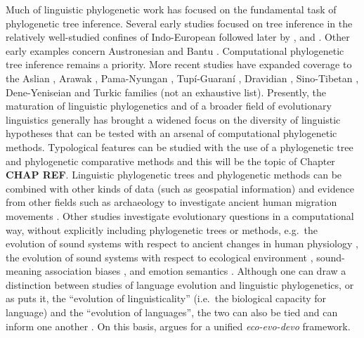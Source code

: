 Much of linguistic phylogenetic work has focused on the fundamental task of phylogenetic tree inference. Several early studies focused on tree inference in the relatively well-studied confines of Indo-European \autocites{gray_language-tree_2003}{atkinson_words_2005}{nicholls_dated_2008} followed later by \textcite{ryder_missing_2011}, \textcite{bouckaert_mapping_2012} and \textcite{chang_ancestry-constrained_2015}. Other early examples concern Austronesian \autocite{gray_language_2000} and Bantu \autocites{holden_bantu_2002}{holden_rapid_2006}. Computational phylogenetic tree inference remains a priority. More recent studies have expanded coverage to the Aslian \autocite{dunn_aslian_2011}, Arawak \autocite{walker_bayesian_2011}, Pama-Nyungan \autocites{bowern_computational_2012}{bouckaert_origin_2018}, Tupí-Guaraní \autocite{michael_bayesian_2015}, Dravidian \autocite{kolipakam_bayesian_2018}, Sino-Tibetan \autocite{sagart_dated_2019}, Dene-Yeniseian \autocites{sicoli_linguistic_2014}[but c.f.][]{yanovich_phylogenetic_2020} and Turkic \autocite{savelyev_bayesian_2020} families (not an exhaustive list). Presently, the maturation of linguistic phylogenetics and of a broader field of evolutionary linguistics generally \autocites{dediu_language_2016}{nolle_language_2020} has brought a widened focus on the diversity of linguistic hypotheses that can be tested with an arsenal of computational phylogenetic methods. Typological features can be studied with the use of a phylogenetic tree and phylogenetic comparative methods \autocite[e.g.][]{dunn_evolved_2011} and this will be the topic of Chapter \textbf{CHAP REF}. Linguistic phylogenetic trees and phylogenetic methods can be combined with other kinds of data (such as geospatial information) and evidence from other fields such as archaeology to investigate ancient human migration movements \autocites[e.g.][]{gray_language_2009}{bouckaert_mapping_2012}{bouckaert_origin_2018}. Other studies investigate evolutionary questions in a computational way, without explicitly including phylogenetic trees or methods, e.g.~the evolution of sound systems with respect to ancient changes in human physiology \autocite{blasi_human_2019}, the evolution of sound systems with respect to ecological environment \autocite{everett_climate_2015}, sound-meaning association biases \autocite{blasi_soundmeaning_2016}, and emotion semantics \autocite{jackson_emotion_2019}. Although one can draw a distinction between studies of language evolution and linguistic phylogenetics, or as \textcite{haspelmath_human_2020} puts it, the ``evolution of linguisticality'' (i.e.~the biological capacity for language) and the ``evolution of languages'', the two can also be tied and can inform one another \autocites{blasi_soundmeaning_2016}{nolle_language_2020}. On this basis, \textcite{segovia-martin_eco-evo-devo_2020} argues for a unified \emph{eco-evo-devo} framework.

